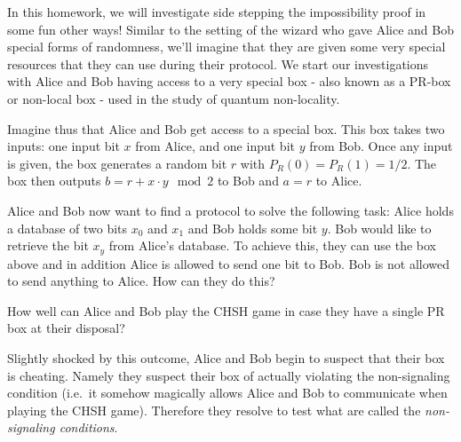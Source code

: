 \documentclass[a4paper,10pt,landscape,twocolumn]{scrartcl}
\begin{document}
\begin{exercise}
In this homework, we will investigate side stepping the impossibility proof in some fun other ways! Similar to the setting of the wizard who gave Alice and Bob special forms of randomness, we'll imagine that they are given some very special resources that they can use during their protocol. We start our investigations with Alice and Bob having access to a very special box - also known as a PR-box or non-local box - used in the study of quantum non-locality. 

Imagine thus that Alice and Bob get access to a special box. This box takes two inputs: one input bit $x$ from Alice, and one input bit $y$ from Bob. Once any input is given, the box generates a random bit $r$ with $P_R(0)=P_R(1)=1/2$. The box then outputs $b=r+ x \cdot y \mod 2$ to Bob and $a=r$ to Alice.

\begin{subex}
Alice and Bob now want to find a protocol to solve the following task: Alice holds a database of two bits $x_0$ and $x_1$ and Bob holds some bit $y$. Bob would like to retrieve the bit $x_y$ from Alice's database. To achieve this, they can use the box above and in addition Alice is allowed to send one bit to Bob. Bob is not allowed to send anything to Alice. How can they do this?
\end{subex}

\begin{subex}
How well can Alice and Bob play the CHSH game in case they have a single PR box at their disposal?
\end{subex}

\begin{subex}
Slightly shocked by this outcome, Alice and Bob begin to suspect that their box is cheating. Namely they suspect their box of actually violating the non-signaling condition (i.e.\ it somehow magically allows Alice and Bob to communicate when playing the CHSH game). Therefore they resolve to test what are called the \emph{non-signaling conditions}. 


\end{subex}
\end{exercise}
\end{document}
